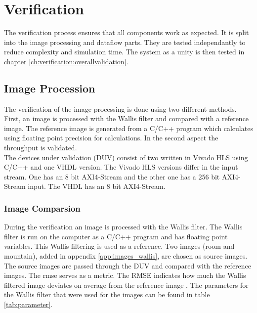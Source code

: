 %
%
\section{Verification} \label{ch:verification}
The verification process ensures that all components work as expected. It is
split into the image processing and dataflow parts. They are tested
independantly to reduce complexity and simulation time. The system as a unity is
then tested in chapter \ref{ch:verification:overallvalidation}.

%
%
\subsection{Image Procession}\label{ch:verification:imageprocessing}
The verification of the image processing is done using two different 
methods. First, an image is processed with the Wallis filter and compared 
with a reference image. The reference image is generated from a C/C++ program 
which calculates using floating point precision for calculations. In the second
aspect the 
throughput is validated. \\
The devices under validation (DUV) consist of two written in Vivado HLS using
C/C++
and one VHDL version. The Vivado HLS versions differ in the input stream. One 
has an 8 bit AXI4-Stream and the other one has a 256 bit AXI4-Stream input. The
VHDL has an 8 bit AXI4-Stream.

\subsubsection*{Image Comparsion}
During the verification an image is processed with the Wallis filter. The Wallis
filter is run on the computer as a C/C++ program and has floating point
variables. This Wallis filtering is used as a reference. Two images (room and
mountain), added in appendix \ref{app:images_wallis}, are chosen as source images. \\
The source images are passed through the DUV and compared with the reference
images. The \gls{rmse} serves as a metric. The RMSE
indicates how much the  Wallis filtered image deviates on average from the
reference image \cite{rmse}. The parameters for the Wallis filter that were used
for the images can be found in table \ref{tab:parameter}.

